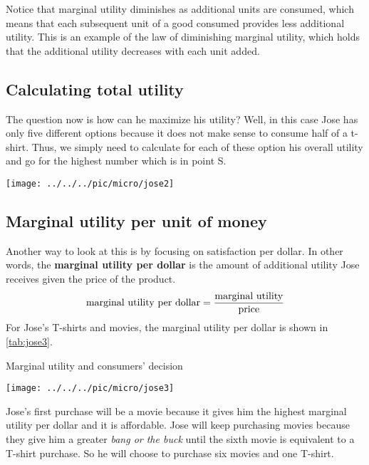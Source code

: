 Notice that marginal utility diminishes as additional units are consumed, which means that each subsequent unit of a good consumed provides less additional utility. This is an example of the law of diminishing marginal utility, which holds that the additional utility decreases with each unit added.

\pbn
\subsection{Calculating total utility}
The question now is how can he maximize his utility? Well, in this case Jose has only five different options because it does not make sense to consume half of a t-shirt. Thus, we simply need to calculate for each of these option his overall utility and go for the highest number which is in point S.
\begin{center}
	\texttt{[image: ../../../pic/micro/jose2]}
\end{center}

\pbn
\subsection{Marginal utility per unit of money}
Another way to look at this is by focusing on satisfaction per dollar. In other words, the \textbf{marginal utility per dollar} is the amount of additional utility Jose receives given the price of the product. 
\[
\textnormal{marginal utility per dollar}=\frac{\textnormal{marginal utility}}{\textnormal{price}}
\]
For Jose’s T-shirts and movies, the marginal utility per dollar is shown in \autoref{tab:jose3}.
\begin{table}[h]
	\caption{Marginal utility and consumers' decision}\label{tab:jose3}
	\begin{center}
		\texttt{[image: ../../../pic/micro/jose3]}
	\end{center}
\end{table}


Jose's first purchase will be a movie because it gives him the highest marginal utility per dollar and it is affordable. Jose will keep purchasing movies because they give him a greater \textit{bang or the buck} until the sixth movie is equivalent to a T-shirt purchase. So he will choose to purchase six movies and one T-shirt.


